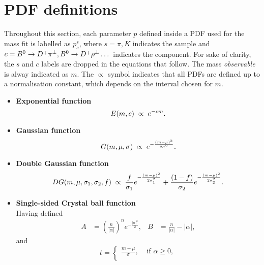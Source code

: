 \section{PDF definitions}
\label{app:pdfsdef}

Throughout this section, each parameter $p$ defined inside a PDF used for the mass fit is labelled as $p^{s}_{c}$, where $s = \pi,K$ indicates the sample and $c = B^0\rightarrow D^\mp\pi^\pm,B^0\rightarrow D^\mp\rho^\pm\dots$ indicates the component. For sake of clarity, the $s$ and $c$ labels are dropped in the equations that follow. The mass \emph{observable} is alway indicated as $m$. The $\propto$ symbol indicates that all PDFs are defined up to a normalisation constant, which depends on the interval chosen for $m$.
\begin{itemize}[noitemsep,topsep=0pt]
\item{\textbf{Exponential function}}
\begin{equation*}
E(m,c) \hspace{1mm}\propto\hspace{1mm} e^{-cm}.
\end{equation*}
\item{\textbf{Gaussian function}} \\
\begin{equation*}
G(m,\mu,\sigma) \hspace{1mm}\propto\hspace{1mm} e^{-\frac{(m-\mu)^{2}}{2\sigma^{2}}}.
\end{equation*}
\item{\textbf{Double Gaussian function}} \\
\begin{equation*}
DG(m,\mu,\sigma_{1},\sigma_{2},f) \hspace{1mm}\propto\hspace{1mm} \frac{f}{\sigma_1} e^{-\frac{(m-\mu)^{2}}{2\sigma_{1}^{2}}} + \frac{(1-f)}{\sigma_2}e^{-\frac{(m-\mu)^{2}}{2\sigma_{2}^{2}}}.
\end{equation*}
\item{\textbf{Single-sided Crystal ball function}} \\
Having defined
\begin{align*}
A &= \left(\frac{n}{|\alpha|}\right)^{n} e^{-\frac{|\alpha|^{2}}{2}}, & B &= \frac{n}{|\alpha|}-|\alpha|,
\end{align*}
and
\begin{equation*}
t = 
\begin{cases}
  \frac{m-\mu}{\sigma}, & \mbox{ if } \alpha\geq0, \\

\end{cases}
\end{equation*}
\end{itemize}
